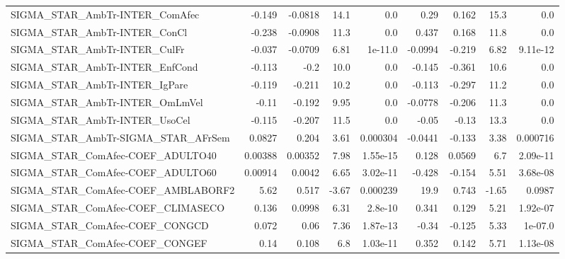 \begin{tabular}{lrrrrrrrr}
SIGMA\_STAR\_AmbTr-INTER\_ComAfec        &      -0.149 &      -0.0818 &     14.1 &      0.0 &       0.29 &       0.162 &         15.3 &           0.0 \\
SIGMA\_STAR\_AmbTr-INTER\_ConCl          &      -0.238 &      -0.0908 &     11.3 &      0.0 &      0.437 &       0.168 &         11.8 &           0.0 \\
SIGMA\_STAR\_AmbTr-INTER\_CulFr          &      -0.037 &      -0.0709 &     6.81 &  1e-11.0 &    -0.0994 &      -0.219 &         6.82 &      9.11e-12 \\
SIGMA\_STAR\_AmbTr-INTER\_EnfCond        &      -0.113 &         -0.2 &     10.0 &      0.0 &     -0.145 &      -0.361 &         10.6 &           0.0 \\
SIGMA\_STAR\_AmbTr-INTER\_IgPare         &      -0.119 &       -0.211 &     10.2 &      0.0 &     -0.113 &      -0.297 &         11.2 &           0.0 \\
SIGMA\_STAR\_AmbTr-INTER\_OmLmVel        &       -0.11 &       -0.192 &     9.95 &      0.0 &    -0.0778 &      -0.206 &         11.3 &           0.0 \\
SIGMA\_STAR\_AmbTr-INTER\_UsoCel         &      -0.115 &       -0.207 &     11.5 &      0.0 &      -0.05 &       -0.13 &         13.3 &           0.0 \\
SIGMA\_STAR\_AmbTr-SIGMA\_STAR\_AFrSem    &      0.0827 &        0.204 &     3.61 & 0.000304 &    -0.0441 &      -0.133 &         3.38 &      0.000716 \\
SIGMA\_STAR\_ComAfec-COEF\_ADULTO40      &     0.00388 &      0.00352 &     7.98 & 1.55e-15 &      0.128 &      0.0569 &          6.7 &      2.09e-11 \\
SIGMA\_STAR\_ComAfec-COEF\_ADULTO60      &     0.00914 &       0.0042 &     6.65 & 3.02e-11 &     -0.428 &      -0.154 &         5.51 &      3.68e-08 \\
SIGMA\_STAR\_ComAfec-COEF\_AMBLABORF2    &        5.62 &        0.517 &    -3.67 & 0.000239 &       19.9 &       0.743 &        -1.65 &        0.0987 \\
SIGMA\_STAR\_ComAfec-COEF\_CLIMASECO     &       0.136 &       0.0998 &     6.31 &  2.8e-10 &      0.341 &       0.129 &         5.21 &      1.92e-07 \\
SIGMA\_STAR\_ComAfec-COEF\_CONGCD        &       0.072 &         0.06 &     7.36 & 1.87e-13 &      -0.34 &      -0.125 &         5.33 &       1e-07.0 \\
SIGMA\_STAR\_ComAfec-COEF\_CONGEF        &        0.14 &        0.108 &      6.8 & 1.03e-11 &      0.352 &       0.142 &         5.71 &      1.13e-08 \\

\end{tabular}
